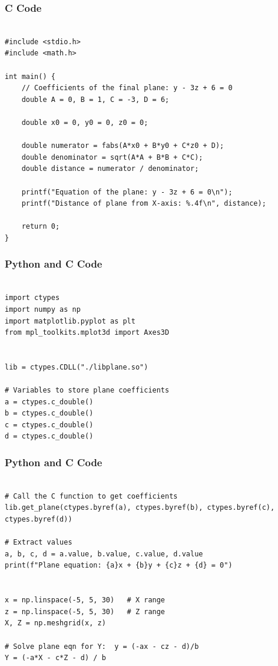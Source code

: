 \documentclass{beamer}
\begin{document}
\begin{frame}[fragile]
\frametitle{ C Code}

\begin{lstlisting}

#include <stdio.h>
#include <math.h>

int main() {
    // Coefficients of the final plane: y - 3z + 6 = 0
    double A = 0, B = 1, C = -3, D = 6;

    double x0 = 0, y0 = 0, z0 = 0;

    double numerator = fabs(A*x0 + B*y0 + C*z0 + D);
    double denominator = sqrt(A*A + B*B + C*C);
    double distance = numerator / denominator;

    printf("Equation of the plane: y - 3z + 6 = 0\n");
    printf("Distance of plane from X-axis: %.4f\n", distance);

    return 0;
}
\end{lstlisting}

\end{frame}


\begin{frame}[fragile]
\frametitle{Python and C Code}

\begin{lstlisting}

import ctypes
import numpy as np
import matplotlib.pyplot as plt
from mpl_toolkits.mplot3d import Axes3D


lib = ctypes.CDLL("./libplane.so")

# Variables to store plane coefficients
a = ctypes.c_double()
b = ctypes.c_double()
c = ctypes.c_double()
d = ctypes.c_double()
\end{lstlisting}

\end{frame}

\begin{frame}[fragile]
\frametitle{Python and C Code}

\begin{lstlisting}

# Call the C function to get coefficients
lib.get_plane(ctypes.byref(a), ctypes.byref(b), ctypes.byref(c), ctypes.byref(d))

# Extract values
a, b, c, d = a.value, b.value, c.value, d.value
print(f"Plane equation: {a}x + {b}y + {c}z + {d} = 0")


x = np.linspace(-5, 5, 30)   # X range
z = np.linspace(-5, 5, 30)   # Z range
X, Z = np.meshgrid(x, z)

# Solve plane eqn for Y:  y = (-ax - cz - d)/b
Y = (-a*X - c*Z - d) / b

\end{lstlisting}

\end{frame}
\end{document}

